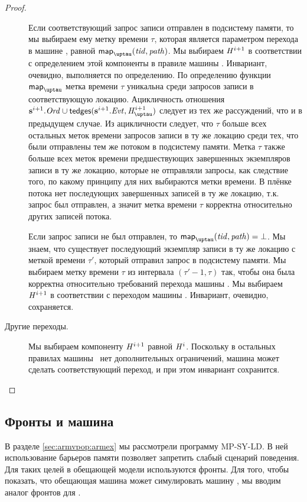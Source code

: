 \begin{proof}
\begin{description}
    Если соответствующий запрос записи отправлен в подсистему памяти, то мы выбираем
    ему метку времени $\tau$, которая является параметром перехода в машине \ARMt,
    равной $\taumapping(\tId, \cpath)$.
    Мы выбираем $\mathit{H}^{i + 1}$ в соответствии с определением этой компоненты в
    правиле  машины \ARMt.
    Инвариант, очевидно, выполняется по определению.
    По определению функции $\taumapping$ метка времени $\tau$ уникальна среди запросов записи
    в соответствующую локацию.
    Ацикличность отношения $\s^{i+1}.\Ord \cup \moTau(\s^{i+1}.\Evt, \tmap^{i + 1})$
    следует из тех же рассуждений, что и в предыдущем случае.
    Из ацикличности следует, что $\tau$ больше всех остальных меток времени
    запросов записи в ту же локацию среди тех, что были отправлены тем же потоком
    в подсистему памяти.
    Метка $\tau$ также больше всех меток времени предшествующих завершенных
    экземпляров записи в ту же локацию, которые не отправляли запросы,
    как следствие того, по какому принципу для них выбираются метки времени.
    В плёнке потока нет последующих завершенных записей в ту же локацию,
    т.к. запрос был отправлен, а значит метка времени $\tau$ корректна относительно
    других записей потока.
    
    Если запрос записи не был отправлен, то $\taumapping(\tId, \cpath) = \bot$.
    Мы знаем, что существует последующий экземпляр записи в ту же локацию с меткой
    времени $\tau'$, который отправил запрос в подсистему памяти.
    Мы выбираем метку времени $\tau$ из интервала $(\tau' - 1, \tau)$ так, чтобы
    она была корректна относительно требований перехода машины \ARMt.
    Мы выбираем $\mathit{H}^{i + 1}$ в соответствии с переходом
     машины \ARMt.
    Инвариант, очевидно, сохраняется.

  \item[Другие переходы.]
    Мы выбираем компоненту $\mathit{H}^{i + 1}$ равной $\mathit{H}^{i}$.
    Поскольку в остальных правилах машины \ARMt~нет дополнительных ограничений,
    машина может сделать соответствующий переход, и при этом инвариант сохранится.
    \qedhere
  \end{description}
\end{proof}

\subsection{Фронты и машина \ARMt}
В разделе \ref{sec:armvpop:armex} мы рассмотрели программу \textrm{MP-SY-LD}.
В ней использование барьеров памяти позволяет запретить слабый сценарий поведения.
Для таких целей в обещающей модели используются фронты.
Для того, чтобы показать, что обещающая машина может симулировать машину \ARMt,
мы вводим аналог фронтов для \ARMt.

